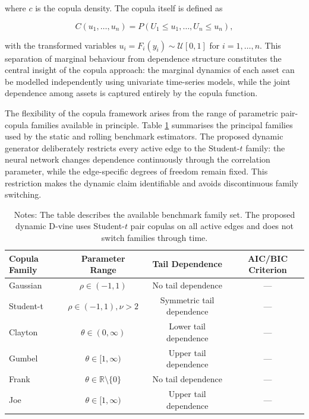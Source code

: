 where \( c \) is the copula density. The copula itself is defined as

\begin{equation}
C(u_1, \dots, u_n) = P(U_1 \leq u_1, \dots, U_n \leq u_n),
\label{eq:copula_def}
\end{equation}

with the transformed variables \( u_i = F_i(y_i) \sim \mathcal{U}[0,1] \) for \( i = 1, \dots, n \). This separation of marginal behaviour from dependence structure constitutes the central insight of the copula approach: the marginal dynamics of each asset can be modelled independently using univariate time-series models, while the joint dependence among assets is captured entirely by the copula function. 

The flexibility of the copula framework arises from the range of parametric pair-copula families available in principle. Table \ref{tab:copula_families} summarises the principal families used by the static and rolling benchmark estimators. The proposed dynamic generator deliberately restricts every active edge to the Student-$t$ family: the neural network changes dependence continuously through the correlation parameter, while the edge-specific degrees of freedom remain fixed. This restriction makes the dynamic claim identifiable and avoids discontinuous family switching.

\begin{table}[H]
\centering
\caption{D-Vine Copula Family Selection Criteria}
\label{tab:copula_families}
\begin{tabular}{l c c c}
\toprule
\textbf{Copula Family} & \textbf{Parameter Range} & \textbf{Tail Dependence} & \textbf{AIC/BIC Criterion} \\
\midrule
Gaussian & \(\rho \in (-1, 1)\) & No tail dependence & — \\
Student-t & \(\rho \in (-1, 1), \nu > 2\) & Symmetric tail dependence & — \\
Clayton & \(\theta \in (0, \infty)\) & Lower tail dependence & — \\
Gumbel & \(\theta \in [1, \infty)\) & Upper tail dependence & — \\
Frank & \(\theta \in \mathbb{R} \setminus \{0\}\) & No tail dependence & — \\
Joe & \(\theta \in [1, \infty)\) & Upper tail dependence & — \\
\bottomrule
\end{tabular}
\caption*{\footnotesize Notes: The table describes the available benchmark family set. The proposed dynamic D-vine uses Student-$t$ pair copulas on all active edges and does not switch families through time.}
\end{table}
\vspace{-15pt}

